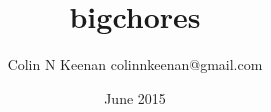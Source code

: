 \documentclass[12pt,letterpaper]{article}
\begin{document}
\title{bigchores{}}
\author{Colin N Keenan colinnkeenan@gmail.com}
\date{June 2015}
\section*{\insulin}

\end{document}
